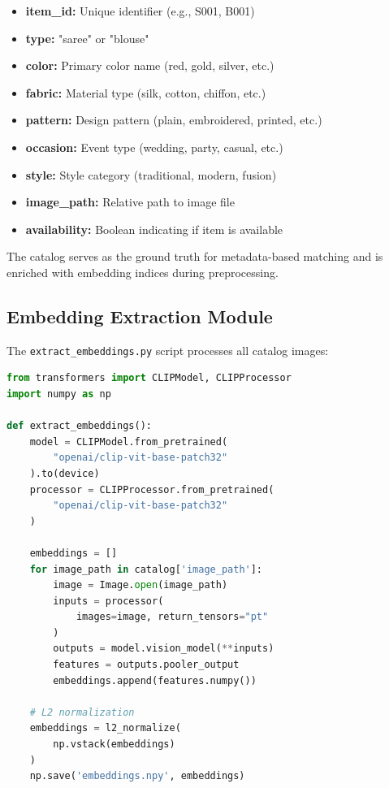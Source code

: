 \documentclass[12pt,a4paper]{report}
\begin{document}
\begin{itemize}
    \item \textbf{item\_id:} Unique identifier (e.g., S001, B001)
    \item \textbf{type:} "saree" or "blouse"
    \item \textbf{color:} Primary color name (red, gold, silver, etc.)
    \item \textbf{fabric:} Material type (silk, cotton, chiffon, etc.)
    \item \textbf{pattern:} Design pattern (plain, embroidered, printed, etc.)
    \item \textbf{occasion:} Event type (wedding, party, casual, etc.)
    \item \textbf{style:} Style category (traditional, modern, fusion)
    \item \textbf{image\_path:} Relative path to image file
    \item \textbf{availability:} Boolean indicating if item is available
\end{itemize}

The catalog serves as the ground truth for metadata-based matching and is enriched with embedding indices during preprocessing.

\subsection{Embedding Extraction Module}

The \texttt{extract\_embeddings.py} script processes all catalog images:

\begin{lstlisting}[language=Python]
from transformers import CLIPModel, CLIPProcessor
import numpy as np

def extract_embeddings():
    model = CLIPModel.from_pretrained(
        "openai/clip-vit-base-patch32"
    ).to(device)
    processor = CLIPProcessor.from_pretrained(
        "openai/clip-vit-base-patch32"
    )
    
    embeddings = []
    for image_path in catalog['image_path']:
        image = Image.open(image_path)
        inputs = processor(
            images=image, return_tensors="pt"
        )
        outputs = model.vision_model(**inputs)
        features = outputs.pooler_output
        embeddings.append(features.numpy())
    
    # L2 normalization
    embeddings = l2_normalize(
        np.vstack(embeddings)
    )
    np.save('embeddings.npy', embeddings)
\end{lstlisting}
\end{document}
